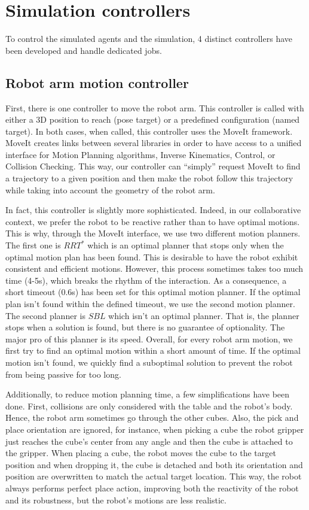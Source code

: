 \section{Simulation controllers}

To control the simulated agents and the simulation, 4 distinct controllers have been developed and handle dedicated jobs. 

\subsection{Robot arm motion controller}

First, there is one controller to move the robot arm. This controller is called with either a 3D position to reach (pose target) or a predefined configuration (named target). In both cases, when called, this controller uses the MoveIt framework. MoveIt creates links between several libraries in order to have access to a unified interface for Motion Planning algorithms, Inverse Kinematics, Control, or Collision Checking. This way, our controller can ``simply'' request MoveIt to find a trajectory to a given position and then make the robot follow this trajectory while taking into account the geometry of the robot arm.

In fact, this controller is slightly more sophisticated. Indeed, in our collaborative context, we prefer the robot to be reactive rather than to have optimal motions. This is why, through the MoveIt interface, we use two different motion planners. The first one is $RRT^*$ which is an optimal planner that stops only when the optimal motion plan has been found. This is desirable to have the robot exhibit consistent and efficient motions. However, this process sometimes takes too much time (4-5s), which breaks the rhythm of the interaction. As a consequence, a short timeout (0.6s) has been set for this optimal motion planner. If the optimal plan isn't found within the defined timeout, we use the second motion planner. 
The second planner is $SBL$ which isn't an optimal planner. That is, the planner stops when a solution is found, but there is no guarantee of optionality. The major pro of this planner is its speed.
Overall, for every robot arm motion, we first try to find an optimal motion within a short amount of time. If the optimal motion isn't found, we quickly find a suboptimal solution to prevent the robot from being passive for too long.

Additionally, to reduce motion planning time, a few simplifications have been done. 
First, collisions are only considered with the table and the robot's body. Hence, the robot arm sometimes go through the other cubes.
Also, the pick and place orientation are ignored, for instance, when picking a cube the robot gripper just reaches the cube's center from any angle and then the cube is attached to the gripper. When placing a cube, the robot moves the cube to the target position and when dropping it, the cube is detached and both its orientation and position are overwritten to match the actual target location. This way, the robot always performs perfect place action, improving both the reactivity of the robot and its robustness, but the robot's motions are less realistic.

